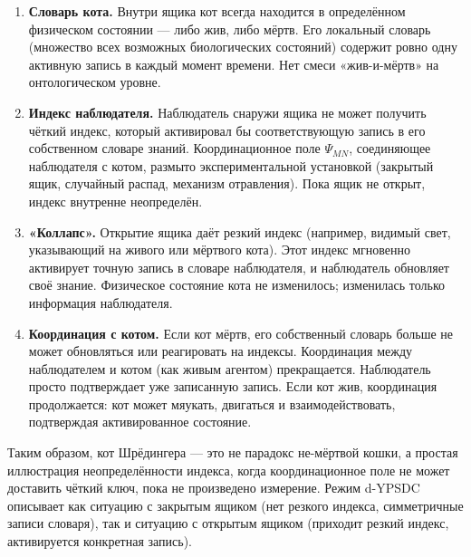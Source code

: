 \documentclass[12pt,a4paper]{article}
\theoremstyle{remark}
\begin{document}
	\begin{enumerate}[leftmargin=*]
		\item \textbf{Словарь кота.} Внутри ящика кот всегда находится в определённом физическом состоянии — либо жив, либо мёртв. Его локальный словарь (множество всех возможных биологических состояний) содержит ровно одну активную запись в каждый момент времени. Нет смеси «жив-и-мёртв» на онтологическом уровне.
		
		\item \textbf{Индекс наблюдателя.} Наблюдатель снаружи ящика не может получить чёткий индекс, который активировал бы соответствующую запись в его собственном словаре знаний. Координационное поле $\Psi_{MN}$, соединяющее наблюдателя с котом, размыто экспериментальной установкой (закрытый ящик, случайный распад, механизм отравления). Пока ящик не открыт, индекс внутренне неопределён.
		
		\item \textbf{«Коллапс».} Открытие ящика даёт резкий индекс (например, видимый свет, указывающий на живого или мёртвого кота). Этот индекс мгновенно активирует точную запись в словаре наблюдателя, и наблюдатель обновляет своё знание. Физическое состояние кота не изменилось; изменилась только информация наблюдателя.
		
		\item \textbf{Координация с котом.} Если кот мёртв, его собственный словарь больше не может обновляться или реагировать на индексы. Координация между наблюдателем и котом (как живым агентом) прекращается. Наблюдатель просто подтверждает уже записанную запись. Если кот жив, координация продолжается: кот может мяукать, двигаться и взаимодействовать, подтверждая активированное состояние.
	\end{enumerate}
	
	Таким образом, кот Шрёдингера — это не парадокс не-мёртвой кошки, а простая иллюстрация неопределённости индекса, когда координационное поле не может доставить чёткий ключ, пока не произведено измерение. Режим d-YPSDC описывает как ситуацию с закрытым ящиком (нет резкого индекса, симметричные записи словаря), так и ситуацию с открытым ящиком (приходит резкий индекс, активируется конкретная запись).
	
\end{document}
